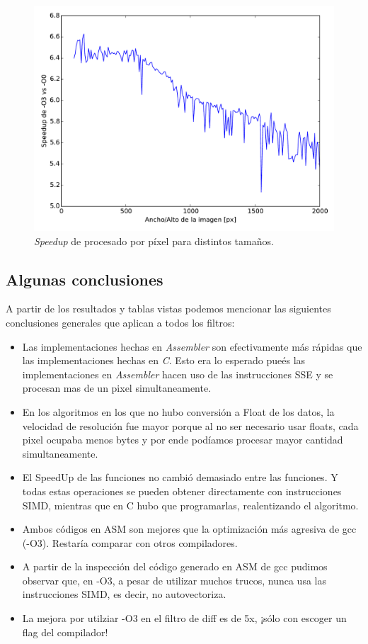 \begin{figure}
  \centering
  \includegraphics[width=0.7\columnwidth]{speedup_optimiz_diff.pdf}
  \caption{\emph{Speedup} de procesado por píxel para distintos tamaños.}
  \label{fig:speedup_optimiz_diff}
\end{figure}


  
\subsection{Algunas conclusiones}

A partir de los resultados y tablas vistas podemos mencionar las siguientes conclusiones generales que aplican a todos los filtros:
  \begin{itemize}
  \item Las implementaciones hechas en \textit{Assembler} son
    efectivamente m\'as r\'apidas que las implementaciones hechas en
    \textit{C}. Esto era lo esperado pue\'es las implementaciones en
    \textit{Assembler} hacen uso de las instrucciones SSE y se
    procesan mas de un pixel simultaneamente.
  \item En los algoritmos en los que no hubo conversi\'on a Float de
    los datos, la velocidad de resoluci\'on fue mayor porque al no ser
    necesario usar floats, cada pixel ocupaba menos bytes y por ende
    pod\'iamos procesar mayor cantidad simultaneamente.
  \item El SpeedUp de las funciones no cambi\'o demasiado entre las
    funciones.  Y todas estas operaciones se pueden obtener
    directamente con instrucciones SIMD, mientras que en C hubo que
    programarlas, realentizando el algoritmo.
  \item Ambos códigos en ASM son mejores que la optimización más
    agresiva de gcc (-O3). Restaría comparar con otros compiladores.
  \item A partir de la inspección del código generado en ASM de gcc
    pudimos observar que, en -O3, a pesar de utilizar muchos trucos,
    nunca usa las instrucciones SIMD, es decir, no autovectoriza.
  \item La mejora por utilziar -O3 en el filtro de diff es de 5x, ¡sólo
    con escoger un flag del compilador!
   \end{itemize}
  






